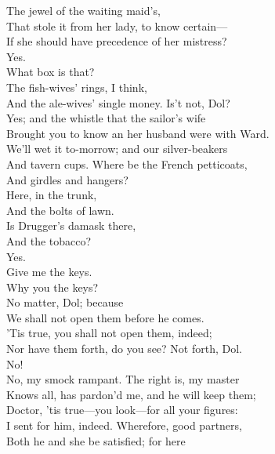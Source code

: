 \documentclass[a4paper,oneside]{memoir}
\begin{document}
\begin{drama*}
\dolspeaks {} The jewel of the waiting maid's,\\
That stole it from her lady, to know certain---\\
\facespeaks If she should have precedence of her mistress?\\
\dolspeaks Yes.\\
\facespeaks {} What box is that?\\
\subtlespeaks {} The fish-wives' rings, I think,\\
And the ale-wives' single money. Is't not, Dol?\\
\dolspeaks Yes; and the whistle that the sailor's wife\\
Brought you to know an her husband were with Ward.\\
\facespeaks We'll wet it to-morrow; and our silver-beakers\\
And tavern cups. Where be the French petticoats,\\
And girdles and hangers?\\
\subtlespeaks {} Here, in the trunk,\\
And the bolts of lawn.\\
\facespeaks {} Is Drugger's damask there,\\
And the tobacco?\\
\subtlespeaks {} Yes.\\
\facespeaks {} Give me the keys.\\
\dolspeaks Why you the keys?\\
\subtlespeaks {} No matter, Dol; because\\
We shall not open them before he comes.\\
\facespeaks 'Tis true, you shall not open them, indeed;\\
Nor have them forth, do you see? Not forth, Dol.\\
\dolspeaks No!\\
\facespeaks {} No, my smock rampant. The right is, my master\\
Knows all, has pardon'd me, and he will keep them;\\
Doctor, 'tis true---you look---for all your figures:\\
I sent for him, indeed. Wherefore, good partners,\\
Both he and she be satisfied; for here\\

\end{drama*}
\end{document}
